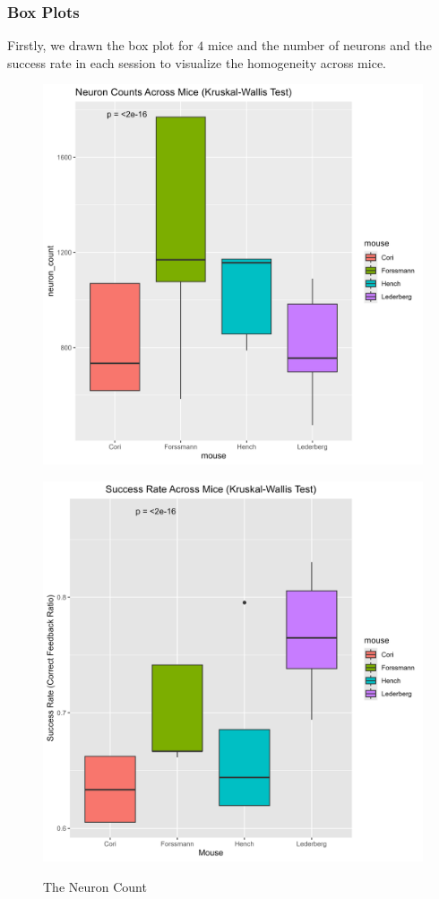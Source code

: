 \documentclass{article}
\begin{document}
	\subsubsection{Box Plots}
	\par Firstly, we drawn the box plot for $4$ mice and the number of neurons and the success rate in each session to visualize the homogeneity across mice.
		\begin{figure}[htbp]
		\centering
		\begin{minipage}[t]{0.48\textwidth}
			\centering
			\includegraphics[scale=0.27]{Pics/012}\label{fig:1.12}
			\caption{The Neuron Count}
		\end{minipage}
		\begin{minipage}[t]{0.48\textwidth}
			\centering
			\includegraphics[scale=0.27]{Pics/015}\label{fig:1.15}

\end{minipage}
\end{figure}
\end{document}
